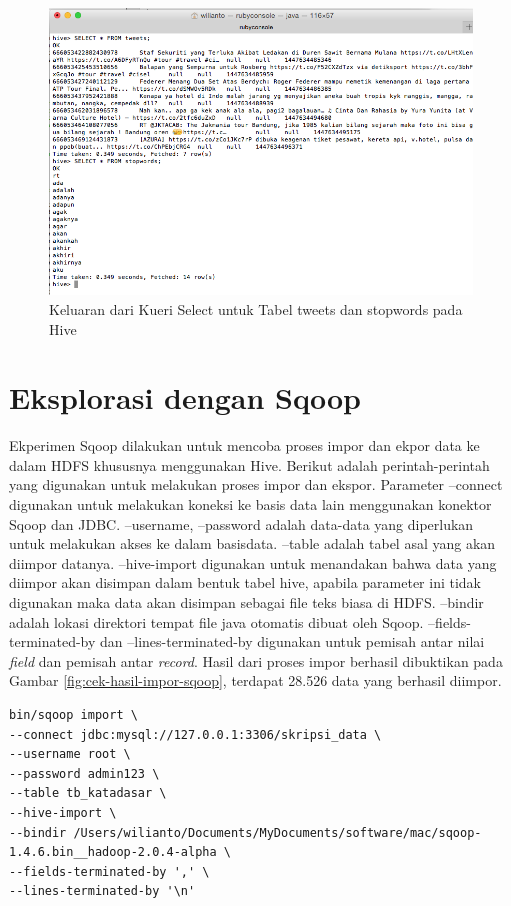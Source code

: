 \begin{figure}
	\centering
	\includegraphics[scale=0.5]{Gambar/cek-hasil-impor-hive.png}
	\caption[Keluaran dari Kueri Select untuk Tabel tweets dan stopwords pada Hive]{Keluaran dari Kueri Select untuk Tabel tweets dan stopwords pada Hive}
	\label{fig:cek-hasil-impor-hive}
\end{figure}


\section{Eksplorasi dengan Sqoop}
\label{sec:eksperimen-sqoop}
Ekperimen Sqoop dilakukan untuk mencoba proses impor dan ekpor data ke dalam HDFS khususnya menggunakan Hive. Berikut adalah perintah-perintah yang digunakan untuk melakukan proses impor dan ekspor. Parameter --connect digunakan untuk melakukan koneksi ke basis data lain menggunakan konektor Sqoop dan JDBC. --username, --password adalah data-data yang diperlukan untuk melakukan akses ke dalam basisdata. --table adalah tabel asal yang akan diimpor datanya. --hive-import digunakan untuk menandakan bahwa data yang diimpor akan disimpan dalam bentuk tabel hive, apabila parameter ini tidak digunakan maka data akan disimpan sebagai file teks biasa di HDFS. --bindir adalah lokasi direktori tempat file java otomatis dibuat oleh Sqoop. --fields-terminated-by dan --lines-terminated-by digunakan untuk pemisah antar nilai \textit{field} dan pemisah antar \textit{record}. Hasil dari proses impor berhasil dibuktikan pada Gambar \ref{fig:cek-hasil-impor-sqoop}, terdapat 28.526 data yang berhasil diimpor.

\begin{lstlisting}[basicstyle=\tiny,caption=Perintah Sqoop untuk Melakukan Impor]
bin/sqoop import \
--connect jdbc:mysql://127.0.0.1:3306/skripsi_data \
--username root \
--password admin123 \
--table tb_katadasar \
--hive-import \
--bindir /Users/wilianto/Documents/MyDocuments/software/mac/sqoop-1.4.6.bin__hadoop-2.0.4-alpha \
--fields-terminated-by ',' \
--lines-terminated-by '\n'
\end{lstlisting}

